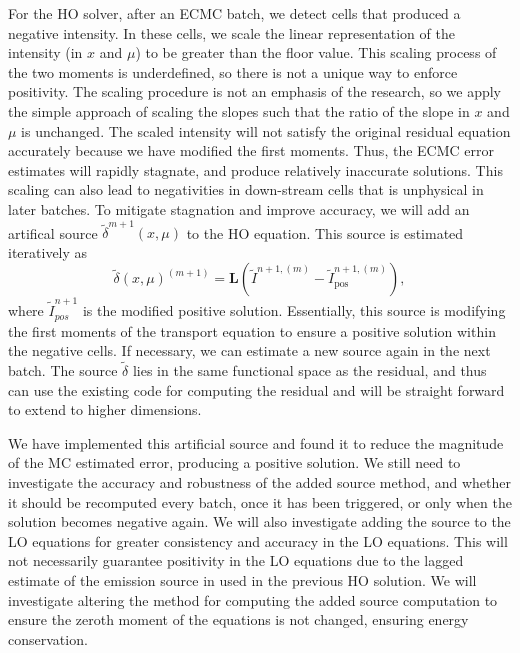 For the HO solver, after an ECMC batch, we detect cells that produced a negative
intensity. In these cells, we scale the linear representation of the intensity (in
$x$ and $\mu$) to be greater than the floor
value.  This scaling process of the two moments is underdefined, so there is not a unique way to enforce
positivity.  The scaling procedure is not an emphasis of the research, so we apply the simple
approach of scaling the slopes such that the ratio of the slope in $x$ and $\mu$ is
unchanged.  The scaled intensity will not satisfy the original residual equation accurately because we have
modified the first moments.   Thus, the ECMC error estimates will rapidly stagnate,
and produce relatively inaccurate solutions.  This scaling can also lead to
negativities in down-stream cells that is unphysical in later batches.  To mitigate
stagnation and improve accuracy, we will add an artifical source $\tilde\delta^{m+1}(x,\mu)$ to the HO equation.
This source is estimated iteratively as
\begin{equation*}
    \tilde\delta(x,\mu)^{(m+1)} = \mathbf{L}(\tilde{I}^{n+1,(m)} -
    \tilde{I}^{n+1,(m)}_{\text{pos}}),
\end{equation*}
where $\tilde{I}_{pos}^{n+1}$ is the modified positive solution.
Essentially, this source is modifying the first moments of the transport equation to
ensure a positive solution within the negative cells.   If necessary, we can estimate a
new source again in the next batch.  The source
$\tilde\delta$ lies in the same functional space as the residual, and thus can use
the existing code for computing the residual and will be straight forward to extend
to higher dimensions.  

We have implemented this artificial source and found it to reduce the
magnitude of the MC estimated error, producing a positive solution. We still need to
investigate the accuracy and robustness of the
added source method, and whether it should be recomputed every batch, once it has been
triggered, or only when the
solution becomes negative again.   We will also
investigate adding the source to the LO equations for greater consistency and accuracy in
the LO equations.  This will not
necessarily guarantee positivity in the LO equations due to the lagged estimate of the emission source in
used in the previous HO solution.  We will investigate altering the  method for computing the added source computation to ensure the zeroth moment
of the equations is not changed, ensuring energy conservation.
